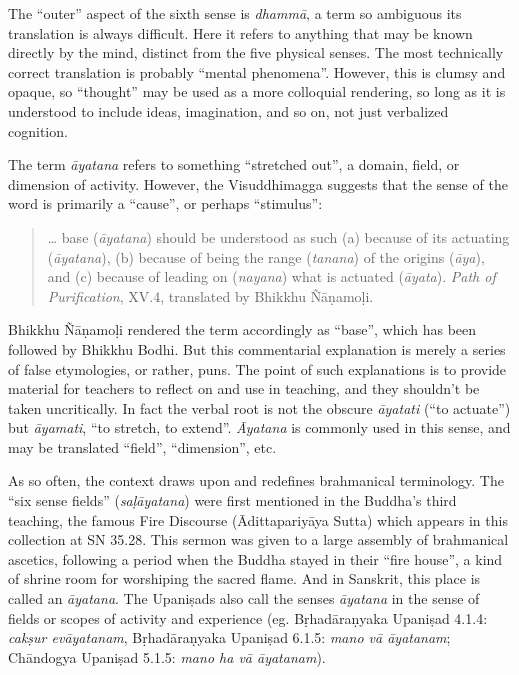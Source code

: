 \documentclass[12pt,openany]{book}%
\begin{document}
The “outer” aspect of the sixth sense is \textit{\textsanskrit{dhammā}}, a term so ambiguous its translation is always difficult. Here it refers to anything that may be known directly by the mind, distinct from the five physical senses. The most technically correct translation is probably “mental phenomena”. However, this is clumsy and opaque, so “thought” may be used as a more colloquial rendering, so long as it is understood to include ideas, imagination, and so on, not just verbalized cognition.

The term \textit{\textsanskrit{āyatana}} refers to something “stretched out”, a domain, field, or dimension of activity. However, the Visuddhimagga suggests that the sense of the word is primarily a “cause”, or perhaps “stimulus”:

\begin{quotation}%
… base (\textit{\textsanskrit{āyatana}}) should be understood as such (a) because of its actuating (\textit{\textsanskrit{āyatana}}), (b) because of being the range (\textit{tanana}) of the origins (\textit{\textsanskrit{āya}}), and (c) because of leading on (\textit{nayana}) what is actuated (\textit{\textsanskrit{āyata}}). \textit{Path of Purification}, XV.4, translated by Bhikkhu \textsanskrit{Ñāṇamoḷi}.

%
\end{quotation}

Bhikkhu \textsanskrit{Ñāṇamoḷi} rendered the term accordingly as “base”, which has been followed by Bhikkhu Bodhi. But this commentarial explanation is merely a series of false etymologies, or rather, puns. The point of such explanations is to provide material for teachers to reflect on and use in teaching, and they shouldn’t be taken uncritically. In fact the verbal root is not the obscure \textit{\textsanskrit{āyatati}} (“to actuate”) but \textit{\textsanskrit{āyamati}}, “to stretch, to extend”. \textit{Āyatana} is commonly used in this sense, and may be translated “field”, “dimension”, etc.

As so often, the context draws upon and redefines brahmanical terminology. The “six sense fields” (\textit{\textsanskrit{saḷāyatana}}) were first mentioned in the Buddha’s third teaching, the famous Fire Discourse (\textsanskrit{Ādittapariyāya} Sutta) which appears in this collection at SN 35.28. This sermon was given to a large assembly of brahmanical ascetics, following a period when the Buddha stayed in their “fire house”, a kind of shrine room for worshiping the sacred flame. And in Sanskrit, this place is called an \textit{\textsanskrit{āyatana}}. The \textsanskrit{Upaniṣads} also call the senses \textit{\textsanskrit{āyatana}} in the sense of fields or scopes of activity and experience (eg. \textsanskrit{Bṛhadāraṇyaka} \textsanskrit{Upaniṣad} 4.1.4: \textit{\textsanskrit{cakṣur} \textsanskrit{evāyatanam}}, \textsanskrit{Bṛhadāraṇyaka} \textsanskrit{Upaniṣad} 6.1.5: \textit{mano \textsanskrit{vā} \textsanskrit{āyatanam}}; \textsanskrit{Chāndogya} \textsanskrit{Upaniṣad} 5.1.5: \textit{mano ha \textsanskrit{vā} \textsanskrit{āyatanam}}).
\end{document}
